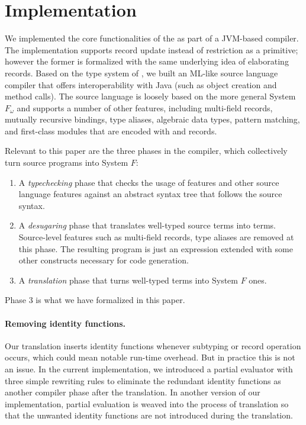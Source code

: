 \section{Implementation}

We implemented the core functionalities of the \name as part of a JVM-based
compiler. The implementation supports record update instead of restriction as a
primitive; however the former is formalized with the same underlying idea of
elaborating records. Based on the type system of \name, we built an ML-like
source language compiler that offers interoperability with Java (such as object
creation and method calls). The source language is loosely based on the more
general System $F_{\omega}$ and supports a
number of other features, including multi-field records, mutually recursive
 bindings, type aliases, algebraic data types, pattern matching, and
first-class modules that are encoded with  and records.

Relevant to this paper are the three phases in the compiler, which 
collectively turn source programs into System $F$:

\begin{enumerate}
\item A \emph{typechecking} phase that checks the usage of \name features and
  other source language features against an abstract syntax tree that follows
  the source syntax.

\item A \emph{desugaring} phase that translates well-typed source terms into
  \name terms. Source-level features such as multi-field records, type aliases
  are removed at this phase. The resulting program is just an \name expression
  extended with some other constructs necessary for code generation.

\item A \emph{translation} phase that turns well-typed \name terms into System
  $F$ ones.
\end{enumerate}

Phase 3 is what we have formalized in this paper.

\paragraph{Removing identity functions.} Our translation inserts identity
functions whenever subtyping or record operation occurs, which could mean
notable run-time overhead. But in practice this is not an issue. In the current
implementation, we introduced a partial evaluator with three simple rewriting
rules to eliminate the redundant identity functions as another compiler phase
after the translation. In another version of our implementation, partial
evaluation is weaved into the process of translation so that the unwanted
identity functions are not introduced during the translation.
